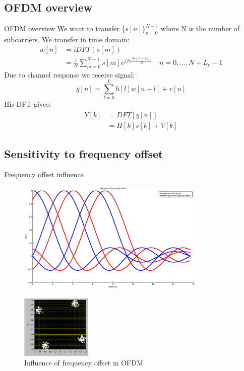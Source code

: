 \documentclass{beamer}
\begin{document}
\subsection{OFDM overview}
\begin{frame}{OFDM overview}
	We want to transfer $\{s[n]\}_{n=0} ^{N-1}$ where N is the number of subcarriers. We transfer in time domain:
	\begin{align*}
		w[n] 	&= iDFT(s[m]) \\ 
			&=\frac{1}{N} \sum_{m=0}^{N-1} s[m] e^{j 2 \pi \frac{m(n-L_c)}{N}} \quad  n=0,..., N+L_c-1
	\end{align*}
	Due to channel response we receive signal:
	$$\overline{y}[n] = \sum_{l=0}^{L} h[l]w[n-l]+v[n]$$
	His DFT gives:
	\begin{align*} 
		\overline{Y}[k] &= DFT[\overline{y}[n]]\\
			& = H[k]s[k]+V[k]
	\end{align*}
\end{frame}

\subsection{Sensitivity to frequency offset}
    
\begin{frame}{Frequency offset influence}
                \begin{figure}[h!] 
 	                \centering
                       	\includegraphics[width= 0.8\textwidth]{frequencyInf.eps}
                \end{figure}
		\begin{figure}[h!]
			\centering
			\includegraphics[width= 0.3\textwidth]{off50_1024.PNG}
			\caption{Influence of frequency offset in OFDM}
		\end{figure}
\end{frame}
\end{document}
